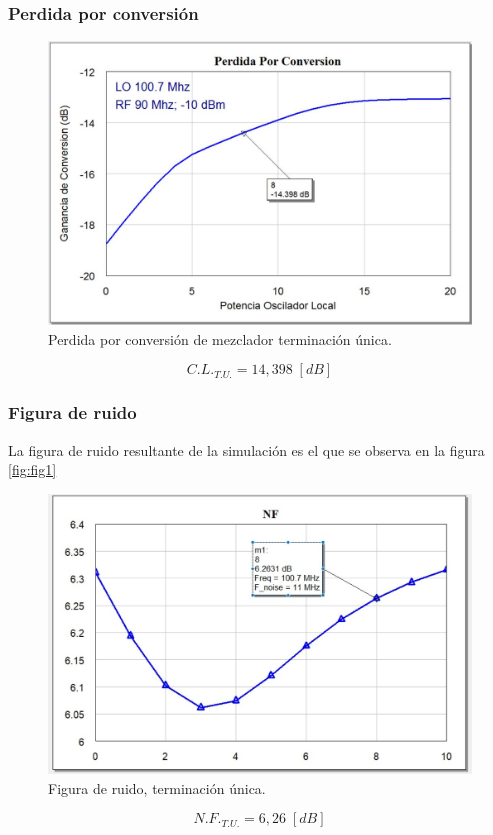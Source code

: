 \documentclass[twocolumn]{article}
\begin{document}
\subsubsection{Perdida por conversión}
%
\begin{figure}[h]
  \centering    
	\includegraphics[scale=0.30]{imagenes/CL1.jpg}
	\caption{Perdida por conversión de mezclador terminación única.}\label{fig:CL1}
\end{figure}
\[C.L._{T.U.} = 14,398 \; [dB] \]
%
\subsubsection{Figura de ruido}
%
La figura de ruido resultante de la simulación es el que se observa en la figura \textcolor{blue}{\ref{fig:fig1}}
\begin{figure}[h]
  \centering    
	\includegraphics[scale=0.30]{imagenes/FN1}
	\caption{Figura de ruido, terminación única.}\label{fig:FN1}
\end{figure}
\[N.F._{T.U.} = 6,26 \; [dB] \]
%
\end{document}
